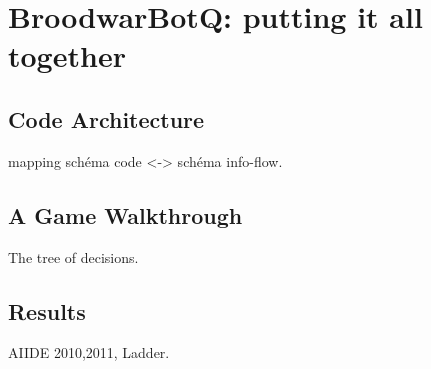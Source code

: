 \chapter{BroodwarBotQ: putting it all together}

\section{Code Architecture}
mapping schéma code <-> schéma info-flow.

\section{A Game Walkthrough}
The tree of decisions.

\section{Results}
AIIDE 2010,2011, Ladder.


